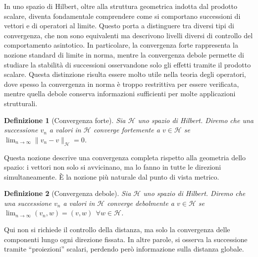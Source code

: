 \documentclass[a4paper,12pt]{report}
\newtheorem{definizione}{Definizione}[chapter]
\begin{document}
In uno spazio di Hilbert, oltre alla struttura geometrica indotta dal prodotto scalare, diventa fondamentale comprendere come si comportano successioni di vettori e di operatori al limite. Questo porta a distinguere tra diversi tipi di convergenza, che non sono equivalenti ma descrivono livelli diversi di controllo del comportamento asintotico. In particolare, la convergenza forte rappresenta la nozione standard di limite in norma, mentre la convergenza debole permette di studiare la stabilità di successioni osservandone solo gli effetti tramite il prodotto scalare. Questa distinzione risulta essere molto utile nella teoria degli operatori, dove spesso la convergenza in norma è troppo restrittiva per essere verificata, mentre quella debole conserva informazioni sufficienti per molte applicazioni strutturali.

\begin{definizione}[Convergenza forte]
    Sia $\mathscr{H}$ uno spazio di Hilbert. Diremo che una successione $v_n$ a valori in $\mathscr{H}$ converge fortemente a $v\in \mathscr{H}$ se $\displaystyle\lim_{n\to\infty}\|v_n-v\|_{\mathscr{H}}=0$.
\end{definizione}

Questa nozione descrive una convergenza completa rispetto alla geometria dello spazio: i vettori non solo si avvicinano, ma lo fanno in tutte le direzioni simultaneamente. È la nozione più naturale dal punto di vista metrico.

\begin{definizione}[Convergenza debole]\label{def: 5.5}
    Sia $\mathscr{H}$ uno spazio di Hilbert. Diremo che una successione $v_n$ a valori in $\mathscr{H}$ converge debolmente a $v\in \mathscr{H}$ se \mbox{$\displaystyle\lim_{n\to \infty}(v_n,w)=(v,w) \ \ \forall w\in \mathscr{H}$}.
\end{definizione}

Qui non si richiede il controllo della distanza, ma solo la convergenza delle componenti lungo ogni direzione fissata. In altre parole, si osserva la successione tramite “proiezioni” scalari, perdendo però informazione sulla distanza globale.

\newpage
\end{document}
